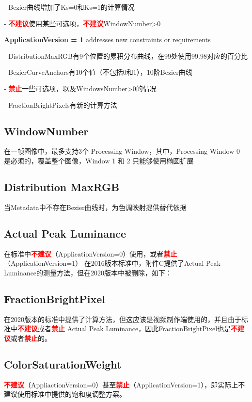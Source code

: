 \documentclass{article}
\begin{document}
- Bezier曲线增加了Ks=0和Ks=1的计算情况

- \textbf{\textcolor{red}{不建议}}使用某些可选项，\textbf{\textcolor{red}{不建议}}WindowNumber>0

\noindent \textbf{ApplicationVersion = 1} addresses new constraints or requirements

- DistributionMaxRGB有9个位置的累积分布曲线，在99处使用99.98对应的百分比

- BezierCurveAnchors有10个值（不包括0和1），10阶Bezier曲线

- \textbf{\textcolor{red}{禁止}}一些可选项，以及WindowsNumber>0的情况

- FractionBrightPixels有新的计算方法

\subsection{WindowNumber}
在一帧图像中，最多支持3个 Processing Window，其中，Processing Window 0 是必须的，覆盖整个图像，Window 1 和 2 只能够使用椭圆扩展

\subsection{Distribution MaxRGB}
当Metadata中不存在Bezier曲线时，为色调映射提供替代依据

\subsection{Actual Peak Luminance}
在标准中\textbf{\textcolor{red}{不建议}}（ApplicationVersion=0）使用，或者\textbf{\textcolor{red}{禁止}}（ApplicationVersion=1）
在2016版本标准中，附件C提供了Actual Peak Luminance的测量方法，但在2020版本中被删除，如下：


\subsection{FractionBrightPixel}
在2020版本的标准中提供了计算方法，但这应该是视频制作端使用的，并且由于标准中\textbf{\textcolor{red}{不建议}}或者\textbf{\textcolor{red}{禁止}} Actual Peak Luminance，因此FractionBrightPixel也是\textbf{\textcolor{red}{不建议}}或者\textbf{\textcolor{red}{禁止}}的。

\subsection{ColorSaturationWeight}
\textbf{\textcolor{red}{不建议}}（AppliactionVersion=0）甚至\textbf{\textcolor{red}{禁止}}（ApplicationVersion=1），即实际上不建议使用标准中提供的饱和度调整方案。
\end{document}
